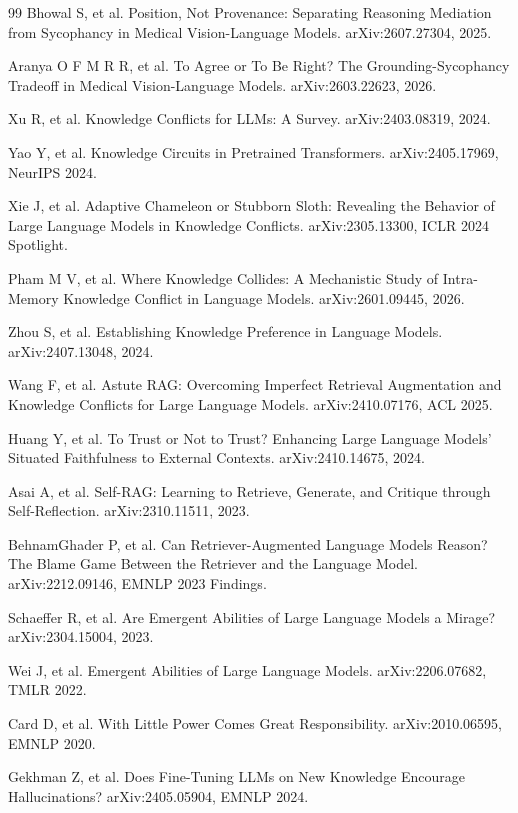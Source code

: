 \documentclass[10.5pt,compsoc,UTF8]{CjC}
\theoremstyle{mystyle}
\begin{document}
\begin{thebibliography}{99}
Bhowal S, et al. Position, Not Provenance: Separating Reasoning Mediation from Sycophancy in Medical Vision-Language Models. arXiv:2607.27304, 2025.

Aranya O F M R R, et al. To Agree or To Be Right? The Grounding-Sycophancy Tradeoff in Medical Vision-Language Models. arXiv:2603.22623, 2026.

Xu R, et al. Knowledge Conflicts for LLMs: A Survey. arXiv:2403.08319, 2024.

Yao Y, et al. Knowledge Circuits in Pretrained Transformers. arXiv:2405.17969, NeurIPS 2024.

Xie J, et al. Adaptive Chameleon or Stubborn Sloth: Revealing the Behavior of Large Language Models in Knowledge Conflicts. arXiv:2305.13300, ICLR 2024 Spotlight.

Pham M V, et al. Where Knowledge Collides: A Mechanistic Study of Intra-Memory Knowledge Conflict in Language Models. arXiv:2601.09445, 2026.

Zhou S, et al. Establishing Knowledge Preference in Language Models. arXiv:2407.13048, 2024.

Wang F, et al. Astute RAG: Overcoming Imperfect Retrieval Augmentation and Knowledge Conflicts for Large Language Models. arXiv:2410.07176, ACL 2025.

Huang Y, et al. To Trust or Not to Trust? Enhancing Large Language Models' Situated Faithfulness to External Contexts. arXiv:2410.14675, 2024.

Asai A, et al. Self-RAG: Learning to Retrieve, Generate, and Critique through Self-Reflection. arXiv:2310.11511, 2023.

BehnamGhader P, et al. Can Retriever-Augmented Language Models Reason? The Blame Game Between the Retriever and the Language Model. arXiv:2212.09146, EMNLP 2023 Findings.

Schaeffer R, et al. Are Emergent Abilities of Large Language Models a Mirage? arXiv:2304.15004, 2023.

Wei J, et al. Emergent Abilities of Large Language Models. arXiv:2206.07682, TMLR 2022.

Card D, et al. With Little Power Comes Great Responsibility. arXiv:2010.06595, EMNLP 2020.

Gekhman Z, et al. Does Fine-Tuning LLMs on New Knowledge Encourage Hallucinations? arXiv:2405.05904, EMNLP 2024.


\end{thebibliography}
\end{document}

